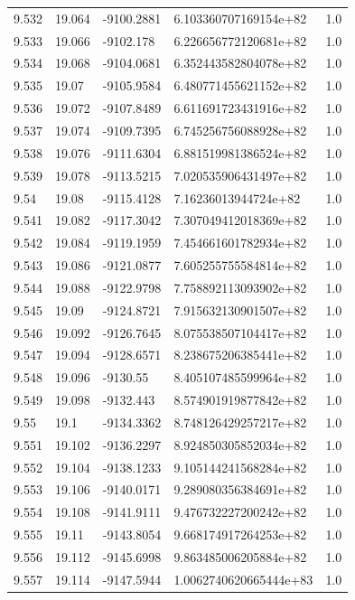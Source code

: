 \begin{tabular}{lllll}
9.532 & 19.064 & -9100.2881 & 6.103360707169154e+82 & 1.0 \\
9.533 & 19.066 & -9102.178 & 6.226656772120681e+82 & 1.0 \\
9.534 & 19.068 & -9104.0681 & 6.352443582804078e+82 & 1.0 \\
9.535 & 19.07 & -9105.9584 & 6.480771455621152e+82 & 1.0 \\
9.536 & 19.072 & -9107.8489 & 6.611691723431916e+82 & 1.0 \\
9.537 & 19.074 & -9109.7395 & 6.745256756088928e+82 & 1.0 \\
9.538 & 19.076 & -9111.6304 & 6.881519981386524e+82 & 1.0 \\
9.539 & 19.078 & -9113.5215 & 7.020535906431497e+82 & 1.0 \\
9.54 & 19.08 & -9115.4128 & 7.16236013944724e+82 & 1.0 \\
9.541 & 19.082 & -9117.3042 & 7.307049412018369e+82 & 1.0 \\
9.542 & 19.084 & -9119.1959 & 7.454661601782934e+82 & 1.0 \\
9.543 & 19.086 & -9121.0877 & 7.605255755584814e+82 & 1.0 \\
9.544 & 19.088 & -9122.9798 & 7.758892113093902e+82 & 1.0 \\
9.545 & 19.09 & -9124.8721 & 7.915632130901507e+82 & 1.0 \\
9.546 & 19.092 & -9126.7645 & 8.075538507104417e+82 & 1.0 \\
9.547 & 19.094 & -9128.6571 & 8.238675206385441e+82 & 1.0 \\
9.548 & 19.096 & -9130.55 & 8.405107485599964e+82 & 1.0 \\
9.549 & 19.098 & -9132.443 & 8.574901919877842e+82 & 1.0 \\
9.55 & 19.1 & -9134.3362 & 8.748126429257217e+82 & 1.0 \\
9.551 & 19.102 & -9136.2297 & 8.924850305852034e+82 & 1.0 \\
9.552 & 19.104 & -9138.1233 & 9.105144241568284e+82 & 1.0 \\
9.553 & 19.106 & -9140.0171 & 9.289080356384691e+82 & 1.0 \\
9.554 & 19.108 & -9141.9111 & 9.476732227200242e+82 & 1.0 \\
9.555 & 19.11 & -9143.8054 & 9.668174917264253e+82 & 1.0 \\
9.556 & 19.112 & -9145.6998 & 9.863485006205884e+82 & 1.0 \\
9.557 & 19.114 & -9147.5944 & 1.0062740620665444e+83 & 1.0 \\

\end{tabular}
